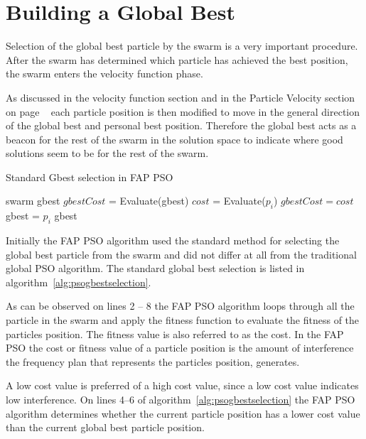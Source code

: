\section{Building a Global Best}
\label{sec:buildglobalbest}
Selection of the global best particle by the swarm is a very important procedure. After the swarm has determined which particle has achieved the best position, the swarm enters the velocity function phase. 

As discussed in the velocity function section and in the Particle Velocity section on page ~\pageref{sec:particleVelocity} each particle position is then modified to move in the general direction of the global best and personal best position. Therefore the global best acts as a beacon for the rest of the swarm in the solution space to indicate where good solutions seem to be for the rest of the swarm.

\begin{algorithm}
\caption{Standard Gbest selection in FAP PSO}
\label{alg:psogbestselection}
\begin{algorithmic}[1]
\REQUIRE swarm
\REQUIRE gbest
\STATE $gbestCost$ = Evaluate(gbest)
	\STATE $cost$ = Evaluate($p_i$)
		\STATE $gbestCost = cost$
		\STATE gbest = $p_i$
	\ENDIF
\ENDFOR
\RETURN gbest
\end{algorithmic}
\end{algorithm}

Initially the FAP PSO algorithm used the standard method for selecting the global best particle from the swarm and did not differ at all from the traditional global PSO algorithm. The standard global best selection is listed in algorithm~\ref{alg:psogbestselection}. 

As can be observed on lines 2 -- 8 the FAP PSO algorithm loops through all the particle in the swarm and apply the fitness function to evaluate the fitness of the particles position. The fitness value is also referred to as the cost. In the FAP PSO the cost or fitness value of a particle position is the amount of interference the frequency plan that represents the particles position, generates.

A low cost value is preferred of a high cost value, since a low cost value indicates low interference. On lines 4--6 of algorithm~\ref{alg:psogbestselection} the FAP PSO algorithm determines whether the current particle position has a lower cost value than the current global best particle position.

